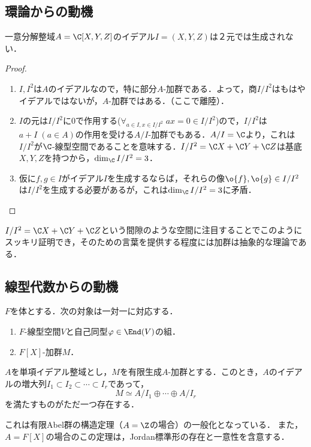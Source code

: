\documentclass[uplatex,dvipdfmx]{jsreport}
\begin{document}
\subsection{環論からの動機}

\begin{proposition}[イデアルの剰余が加群になる]
    一意分解整域$A=\C[X,Y,Z]$のイデアル$I=(X,Y,Z)$は２元では生成されない．
\end{proposition}
\begin{proof}\mbox{}
    \begin{enumerate}
        \item $I,I^2$は$A$のイデアルなので，特に部分$A$-加群である．よって，商$I/I^2$はもはやイデアルではないが，$A$-加群ではある．（ここで離陸）．
        \item $I$の元は$I/I^2$に$0$で作用する($\forall_{a\in I,x\in I/I^2}\;ax=0\in I/I^2$)ので，$I/I^2$は$a+I\;(a\in A)$の作用を受ける$A/I$-加群でもある．$A/I=\C$より，これは$I/I^2$が$\C$-線型空間であることを意味する．$I/I^2=\C X+\C Y+\C Z$は基底$X,Y,Z$を持つから，$\dim_\C I/I^2=3$．
        \item 仮に$f,g\in I$がイデアル$I$を生成するならば，それらの像$\o{f},\o{g}\in I/I^2$は$I/I^2$を生成する必要があるが，これは$\dim_\C I/I^2=3$に矛盾．
    \end{enumerate}
\end{proof}
\begin{remarks}
    $I/I^2=\C X+\C Y+\C Z$という間隙のような空間に注目することでこのようにスッキリ証明でき，そのための言葉を提供する程度には加群は抽象的な理論である．
\end{remarks}

\subsection{線型代数からの動機}

\begin{proposition}[線型空間の自己同型の問題を解決するにはその係数の多項式の加群の理論を構築すれば良い]
    $F$を体とする．次の対象は一対一に対応する．
    \begin{enumerate}
        \item $F$-線型空間$V$と自己同型$\varphi\in\End(V)$の組．
        \item $F[X]$-加群$M$．
    \end{enumerate}
\end{proposition}

\begin{theorem}[単項イデアル整域上の有限生成加群の構造定理]
    $A$を単項イデアル整域とし，$M$を有限生成$A$-加群とする．このとき，$A$のイデアルの増大列$I_1\subset I_2\subset\cdots\subset I_r$であって，
    \[M\simeq A/I_1\oplus\cdots\oplus A/I_r\]
    を満たすものがただ一つ存在する．
\end{theorem}
\begin{remarks}
    これは有限Abel群の構造定理（$A=\Z$の場合）の一般化となっている．
    また，$A=F[X]$の場合のこの定理は，Jordan標準形の存在と一意性を含意する．
\end{remarks}
\end{document}
